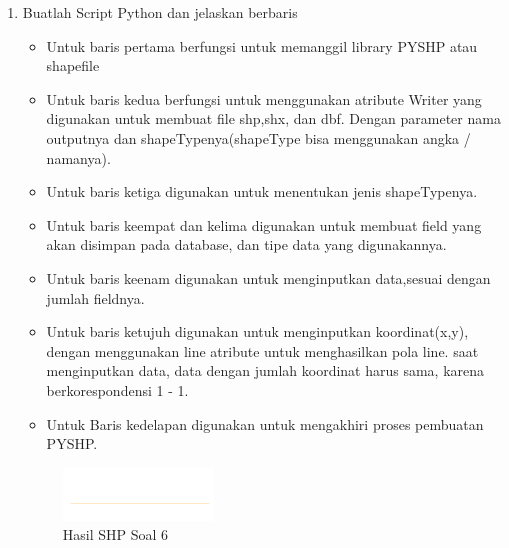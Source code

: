 \begin{enumerate}
	\item Buatlah Script Python dan jelaskan berbaris
	
	\begin{itemize}
		\item Untuk baris pertama berfungsi untuk memanggil library PYSHP atau shapefile
		\item Untuk baris kedua berfungsi untuk menggunakan atribute Writer yang digunakan untuk membuat file shp,shx, dan dbf. \hfill\break Dengan parameter nama outputnya dan shapeTypenya(shapeType bisa menggunakan angka / namanya).
		\item Untuk baris ketiga digunakan untuk menentukan jenis shapeTypenya.
		\item Untuk baris keempat dan kelima digunakan untuk membuat field yang akan disimpan pada database, dan tipe data yang digunakannya.
		\item Untuk baris keenam digunakan untuk menginputkan data,sesuai dengan jumlah fieldnya.
		\item Untuk baris ketujuh digunakan untuk menginputkan koordinat(x,y), dengan menggunakan line atribute untuk menghasilkan pola line. \hfill\break
		saat menginputkan data, data dengan jumlah koordinat harus sama, karena berkorespondensi 1 - 1.
		\item Untuk Baris kedelapan digunakan untuk mengakhiri proses pembuatan PYSHP.
	\end{itemize}
	\hfill\break
	\begin{figure}[H]
		\includegraphics[width=4cm]{figures/1174027/2/soal6.png}
		\centering
		\caption{Hasil SHP Soal 6}
	\end{figure}


\end{enumerate}
